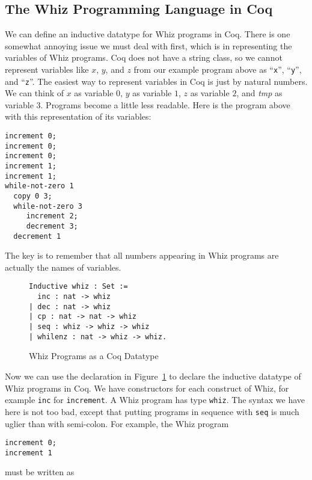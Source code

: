 \documentclass{book}[12pt]
\begin{document}
\subsection{The Whiz Programming Language in Coq}

We can define an inductive datatype for Whiz programs in Coq.  There
is one somewhat annoying issue we must deal with first, which is in
representing the variables of Whiz programs.  Coq does not have a
string class, so we cannot represent variables like $x$, $y$, and $z$
from our example program above as ``\texttt{x}'', ``\texttt{y}'', and
``\texttt{z}''.  The easiest way to represent variables in Coq is just
by natural numbers.  We can think of $x$ as variable $0$, $y$ as
variable $1$, $z$ as variable $2$, and \textit{tmp} as variable $3$.
Programs become a little less readable.  Here is the program above
with this representation of its variables:

\begin{verbatim}
increment 0;
increment 0;
increment 0;
increment 1;
increment 1;
while-not-zero 1
  copy 0 3;
  while-not-zero 3
     increment 2;
     decrement 3;
  decrement 1
\end{verbatim}

\noindent The key is to remember that all numbers appearing in Whiz
programs are actually the names of variables.

\begin{figure}
\begin{verbatim}
Inductive whiz : Set :=
  inc : nat -> whiz
| dec : nat -> whiz
| cp : nat -> nat -> whiz
| seq : whiz -> whiz -> whiz
| whilenz : nat -> whiz -> whiz.
\end{verbatim}
\caption{\label{fig:whiz}Whiz Programs as a Coq Datatype}
\end{figure}

Now we can use the declaration in Figure~\ref{fig:whiz} to declare the
inductive datatype of Whiz programs in Coq.  We have constructors for
each construct of Whiz, for example \texttt{inc} for
\texttt{increment}.  A Whiz program has type \texttt{whiz}.  The
syntax we have here is not too bad, except that putting programs in
sequence with \texttt{seq} is much uglier than with semi-colon.  For
example, the Whiz program

\begin{verbatim}
increment 0;
increment 1
\end{verbatim}

\noindent must be written as
\end{document}
